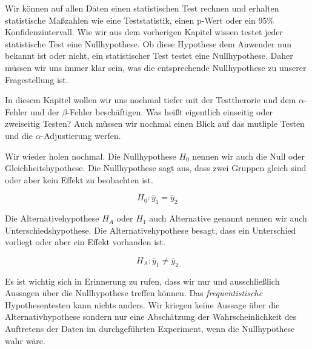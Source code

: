 \documentclass[
  letterpaper,
]{scrbook}
\begin{document}
Wir können auf allen Daten einen statistischen Test rechnen und erhalten
statistische Maßzahlen wie eine Teststatistik, einen p-Wert oder ein
95\% Konfidenzintervall. Wie wir aus dem vorherigen Kapitel wissen
testet jeder statistische Test eine Nullhypothese. Ob diese Hypothese
dem Anwender nun bekannt ist oder nicht, ein statistischer Test testet
eine Nullhypothese. Daher müssen wir uns immer klar sein, was die
entsprechende Nullhypothese zu unserer Fragestellung ist.

In diesem Kapitel wollen wir uns nochmal tiefer mit der Testtherorie und
dem \(\alpha\)-Fehler und der \(\beta\)-Fehler beschäftigen. Was heißt
eigentlich einseitig oder zweiseitig Testen? Auch müssen wir nochmal
einen Blick auf das mutliple Testen und die \(\alpha\)-Adjustierung
werfen.

Wir wieder holen nochmal. Die Nullhypothese \(H_0\) nennen wir auch die
Null oder Gleichheitshypothese. Die Nullhypothese sagt aus, dass zwei
Gruppen gleich sind oder aber kein Effekt zu beobachten ist.

\[
H_0: \bar{y}_{1} = \bar{y}_{2}
\]

Die Alternativehypothese \(H_A\) oder \(H_1\) auch Alternative genannt
nennen wir auch Unterschiedshypothese. Die Alternativehypothese besagt,
dass ein Unterschied vorliegt oder aber ein Effekt vorhanden ist.

\[
H_A: \bar{y}_{1} \neq \bar{y}_{2}
\]

{}

Es ist wichtig sich in Erinnerung zu rufen, dass wir nur und
ausschließlich Aussagen über die Nullhypothese treffen können. Das
\emph{frequentistische} Hypothesentesten kann nichts anders. Wir kriegen
keine Aussage über die Alternativhypothese sondern nur eine Abschätzung
der Wahrscheinlichkeit des Auftretens der Daten im durchgeführten
Experiment, wenn die Nullhypothese wahr wäre.
\end{document}
